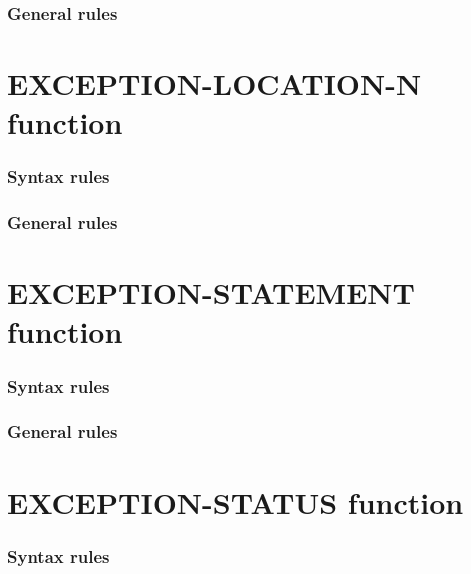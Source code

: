 \subsubsection{General rules}

\section{EXCEPTION-LOCATION-N function}

\begin{syntax}
\end{syntax}

\subsubsection{Syntax rules}

\subsubsection{General rules}

\section{EXCEPTION-STATEMENT function}

\begin{syntax}
   
\end{syntax}

\subsubsection{Syntax rules}

\subsubsection{General rules}

\section{EXCEPTION-STATUS function}

\begin{syntax}
   
\end{syntax}

\subsubsection{Syntax rules}

